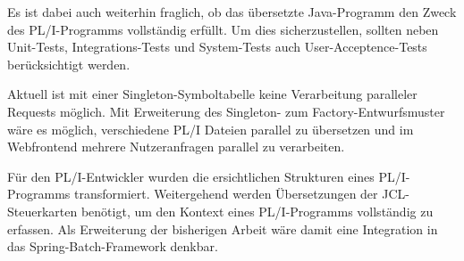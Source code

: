 Es ist dabei auch weiterhin fraglich, ob das übersetzte Java-Programm den Zweck des PL/I-Programms vollständig erfüllt. 
Um dies sicherzustellen, sollten neben Unit-Tests, Integrations-Tests und System-Tests auch User-Acceptence-Tests berücksichtigt werden.

Aktuell ist mit einer Singleton-Symboltabelle keine Verarbeitung paralleler Requests möglich. Mit Erweiterung des Singleton- zum Factory-Entwurfsmuster wäre es möglich, verschiedene PL/I Dateien parallel zu übersetzen und im Webfrontend mehrere Nutzeranfragen parallel zu verarbeiten. 

Für den PL/I-Entwickler wurden die ersichtlichen Strukturen eines PL/I-Programms transformiert. Weitergehend werden Übersetzungen der JCL-Steuerkarten benötigt, 
um den Kontext eines PL/I-Programms vollständig zu erfassen. Als Erweiterung der bisherigen Arbeit wäre damit eine Integration in das Spring-Batch-Framework denkbar.







